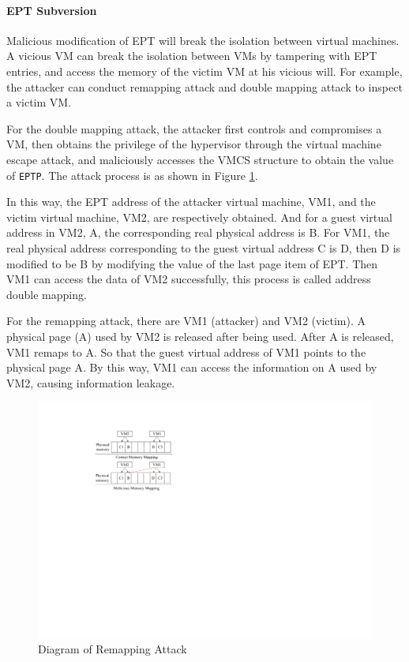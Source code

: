 \paragraph{EPT Subversion}
Malicious modification of EPT will break the isolation between virtual machines. A vicious VM can break the isolation between VMs by tampering with EPT entries, and access the memory of the victim VM at his vicious will. For example, the attacker can conduct remapping attack and double mapping attack to inspect a victim VM. 

For the double mapping attack, the attacker first controls and compromises a VM, then obtains the privilege of the hypervisor through the virtual machine escape attack, and maliciously accesses the VMCS structure to obtain the value of \verb|EPTP|. The attack process is as shown in Figure \ref{pic:remap}. 

In this way, the EPT address of the attacker virtual machine, VM1, and the victim virtual machine, VM2, are respectively obtained. And for a guest virtual address in VM2, A, the corresponding real physical address is B. For VM1, the real physical address corresponding to the guest virtual address C is D, then D is modified to be B by modifying the value of the last page item of EPT. Then VM1 can access the data of VM2 successfully, this process is called address double mapping.

For the remapping attack, there are VM1 (attacker) and VM2 (victim). A physical page (A) used by VM2 is released after being used. After A is released, VM1 remaps to A. So that the guest virtual address of VM1 points to the physical page A. By this way, VM1 can access the information on A used by VM2, causing information leakage.


\begin{figure}
    \centering
    \includegraphics[width=0.8\linewidth]{IMG/remap.pdf}
    \caption{Diagram of Remapping Attack}
    \label{pic:remap}
\end{figure}

